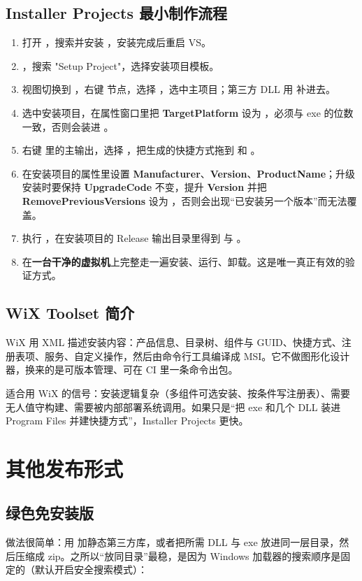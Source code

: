 \subsection{Installer Projects 最小制作流程}
\begin{enumerate}
  \item 打开 ，搜索并安装 ，安装完成后重启 VS。
  \item {}，搜索 "Setup Project"，选择安装项目模板。
  \item 视图切换到 ，右键  节点，选择 ，选中主项目；第三方 DLL 用  补进去。
  \item 选中安装项目，在属性窗口里把 \textbf{TargetPlatform} 设为 ，必须与 exe 的位数一致，否则会装进 。
  \item 右键  里的主输出，选择 ，把生成的快捷方式拖到  和 。
  \item 在安装项目的属性里设置 \textbf{Manufacturer}、\textbf{Version}、\textbf{ProductName}；升级安装时要保持 \textbf{UpgradeCode} 不变，提升 \textbf{Version} 并把 \textbf{RemovePreviousVersions} 设为 ，否则会出现“已安装另一个版本”而无法覆盖。
  \item 执行 ，在安装项目的 Release 输出目录里得到  与 。
  \item 在\textbf{一台干净的虚拟机}上完整走一遍安装、运行、卸载。这是唯一真正有效的验证方式。
\end{enumerate}
\subsection{WiX Toolset 简介}
WiX 用 XML 描述安装内容：产品信息、目录树、组件与 GUID、快捷方式、注册表项、服务、自定义操作，然后由命令行工具编译成 MSI。它不做图形化设计器，换来的是可版本管理、可在 CI 里一条命令出包。

适合用 WiX 的信号：安装逻辑复杂（多组件可选安装、按条件写注册表）、需要无人值守构建、需要被内部部署系统调用。如果只是“把 exe 和几个 DLL 装进 Program Files 并建快捷方式”，Installer Projects 更快。
\section{其他发布形式}
\subsection{绿色免安装版}
做法很简单：用  加静态第三方库，或者把所需 DLL 与 exe 放进同一层目录，然后压缩成 zip。之所以“放同目录”最稳，是因为 Windows 加载器的搜索顺序是固定的（默认开启安全搜索模式）：

